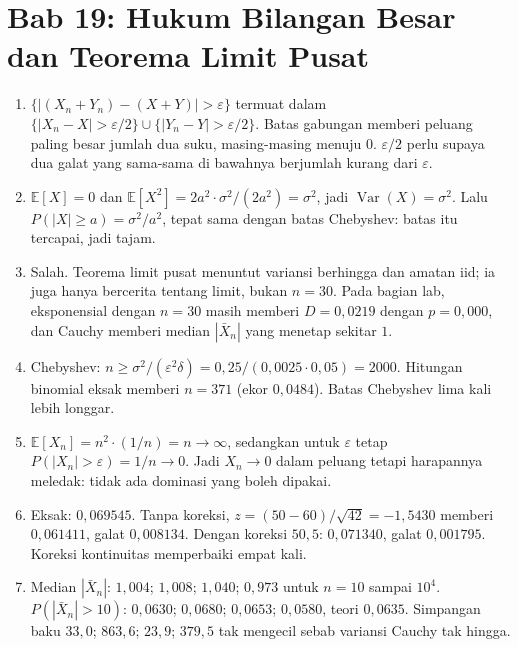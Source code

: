 \section*{Bab 19: Hukum Bilangan Besar dan Teorema Limit Pusat}
\begin{enumerate}[label=\textbf{19.\arabic*}]
  \item $\{|(X_{n}+Y_{n})-(X+Y)|>\varepsilon\}$ termuat dalam
        $\{|X_{n}-X|>\varepsilon/2\}\cup\{|Y_{n}-Y|>\varepsilon/2\}$. Batas gabungan
        memberi peluang paling besar jumlah dua suku, masing-masing menuju $0$.
        $\varepsilon/2$ perlu supaya dua galat yang sama-sama di bawahnya berjumlah
        kurang dari $\varepsilon$.

  \item $\mathbb{E}[X]=0$ dan $\mathbb{E}[X^{2}]=2a^{2}\cdot\sigma^{2}/(2a^{2})=\sigma^{2}$,
        jadi $\operatorname{Var}(X)=\sigma^{2}$. Lalu
        $P(|X|\ge a)=\sigma^{2}/a^{2}$, tepat sama dengan batas Chebyshev: batas itu
        tercapai, jadi tajam.

  \item Salah. Teorema limit pusat menuntut variansi berhingga dan amatan iid; ia juga
        hanya bercerita tentang limit, bukan $n=30$. Pada bagian lab, eksponensial
        dengan $n=30$ masih memberi $D=0{,}0219$ dengan $p=0{,}000$, dan Cauchy
        memberi median $|\bar X_{n}|$ yang menetap sekitar $1$.

  \item Chebyshev: $n\ge\sigma^{2}/(\varepsilon^{2}\delta)=0{,}25/(0{,}0025\cdot0{,}05)
        =2000$. Hitungan binomial eksak memberi $n=371$ (ekor $0{,}0484$). Batas
        Chebyshev lima kali lebih longgar.

  \item $\mathbb{E}[X_{n}]=n^{2}\cdot(1/n)=n\to\infty$, sedangkan untuk
        $\varepsilon$ tetap $P(|X_{n}|>\varepsilon)=1/n\to0$. Jadi $X_{n}\to0$ dalam
        peluang tetapi harapannya meledak: tidak ada dominasi yang boleh dipakai.

  \item Eksak: $0{,}069545$. Tanpa koreksi, $z=(50-60)/\sqrt{42}=-1{,}5430$ memberi
        $0{,}061411$, galat $0{,}008134$. Dengan koreksi $50{,}5$:
        $0{,}071340$, galat $0{,}001795$. Koreksi kontinuitas memperbaiki empat kali.

  \item Median $|\bar X_{n}|$: $1{,}004$; $1{,}008$; $1{,}040$; $0{,}973$ untuk
        $n=10$ sampai $10^{4}$. $P(|\bar X_{n}|>10)$: $0{,}0630$; $0{,}0680$;
        $0{,}0653$; $0{,}0580$, teori $0{,}0635$. Simpangan baku $33{,}0$; $863{,}6$;
        $23{,}9$; $379{,}5$ tak mengecil sebab variansi Cauchy tak hingga.


\end{enumerate}
